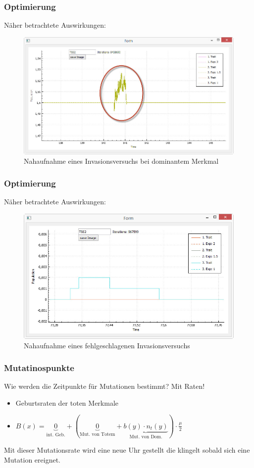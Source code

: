 \documentclass{beamer}
\begin{document}
		\begin{frame}
			\frametitle{Optimierung}
			Näher betrachtete Auswirkungen:
			\pause
			\begin{figure}[H]
				\centering
				\includegraphics[width=0.8\linewidth]{./TSS_MutationZoom}
				\caption[Invasionsversuch]{Nahaufnahme eines Invasionsversuchs bei dominantem Merkmal}
				\label{fig:TSS_MutationZoom}
			\end{figure}
		\end{frame}	
		\begin{frame}
			\frametitle{Optimierung}
			Näher betrachtete Auswirkungen:
			\begin{figure}[H]
				\centering
				\includegraphics[width=0.8\linewidth]{./TSS_InvasionFail}
				\caption[Invasion Fehlgeschlagen]{Nahaufnahme eines fehlgeschlagenen Invasionsversuchs}
				\label{fig:TSS_InvasionFail}
			\end{figure}
		\end{frame}
		\begin{frame}
			\frametitle{Mutatinospunkte}
			Wie werden die Zeitpunkte für Mutationen bestimmt? \pause
			Mit Raten!
			\begin{itemize}
				\item Geburtsraten der toten Merkmale
				\pause
				\item $ B(x) =  \underbrace{0}_{\text{int. Geb.}} + ( \underbrace{0}_{\text{Mut. von Totem}} + \underbrace{b(y)\cdot n_t(y)}_{\text{Mut. von Dom.}} )\cdot \frac{\mu}{2} $
			\end{itemize}
			Mit dieser Mutationsrate wird eine neue Uhr gestellt die klingelt sobald sich eine Mutation ereignet.
		\end{frame}
\end{document}
